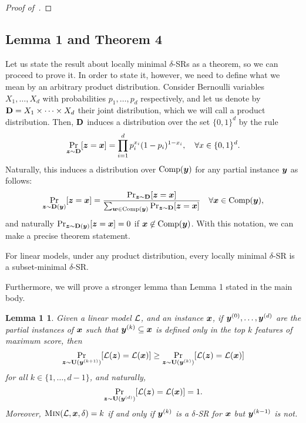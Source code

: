 \begin{proof}[Proof of~]
\end{proof}




\subsection{Lemma 1 and Theorem 4}
Let us state the result about locally minimal $\delta$-SRs as a theorem, so we can proceed to prove it. 
In order to state it, however, we need to define what we mean by an arbitrary product distribution. Consider Bernoulli variables $X_1, \ldots, X_d$ with probabilities $p_1, \ldots, p_d$ respectively, and let us denote by $\mathbf{D} = X_1 \times \cdots \times X_d$ their joint distribution, which we will call a product distribution. Then, $\mathbf{D}$ induces a distribution over the set $\{0, 1\}^d$ by the rule
\[ 
    \Pr_{{\bm{z}} \sim \mathbf{D}}[{\bm{z}} = {\bm{x}}] = \prod_{i=1}^d p_i^{x_i} (1-p_i)^{1-x_i}, \quad \forall x \in \{0, 1\}^d.
\]
Naturally, this induces a distribution over $\operatorname{Comp}({\bm{y}})$ for any partial instance ${\bm{y}}$ as follows:
\[ 
    \Pr_{{\bm{z}} \sim \mathbf{D}({\bm{y}})}[{\bm{z}} = {\bm{x}}] =
        \frac{\Pr_{{\bm{z}} \sim \mathbf{D}}[{\bm{z}} = {\bm{x}}]}{\sum_{{\bm{w}} \in \operatorname{Comp}({\bm{y}})} \Pr_{{\bm{z}} \sim \mathbf{D}}[{\bm{z}} = {\bm{x}}]} \quad \forall {\bm{x}} \in \operatorname{Comp}({\bm{y}}),
\]
and naturally $\Pr_{{\bm{z}} \sim \mathbf{D}({\bm{y}})}[{\bm{z}} = {\bm{x}}] = 0$ if ${\bm{x}} \not\in \operatorname{Comp}({\bm{y}})$.
With this notation, we can make a precise theorem statement.
\begin{theorem}\label{thm:locally-minimal}
    For linear models, under any product distribution, every locally minimal $\delta$-SR is a subset-minimal $\delta$-SR.
\end{theorem}

Furthermore, we will prove a stronger lemma than Lemma 1 stated in the main body.

\newtheorem*{theorem8}{Lemma 1}
\begin{theorem8} %
    Given a linear model $\mathcal{L}$, and an instance ${\bm{x}}$, if ${\bm{y}}^{(0)}, \ldots, {\bm{y}}^{(d)}$ are the partial instances of ${\bm{x}}$ such that ${\bm{y}}^{(k)} \subseteq {\bm{x}}$ is defined only in the top $k$ features of maximum score, then
    \[ 
        \Pr_{{\bm{z}} \sim \mathbf{U}({\bm{y}}^{(k+1)})}[\mathcal{L}({\bm{z}}) = \mathcal{L}({\bm{x}})] \geq \Pr_{{\bm{z}} \sim \mathbf{U}({\bm{y}}^{(k)})}[\mathcal{L}({\bm{z}}) = \mathcal{L}({\bm{x}})]
    \]
    for all $k \in \{1, \ldots, d-1\}$, and naturally, 
    \[ 
    \Pr_{{\bm{z}} \sim \mathbf{U}({\bm{y}}^{(d)})}[\mathcal{L}({\bm{z}}) = \mathcal{L}({\bm{x}})] = 1.
    \]
    Moreover, $\operatorname{\textsc{Min}}(\mathcal{L}, {\bm{x}}, \delta) = k$ if and only if ${\bm{y}}^{(k)}$ is a $\delta$-SR for ${\bm{x}}$ but ${\bm{y}}^{(k-1)}$ is not. 
 \end{theorem8}


